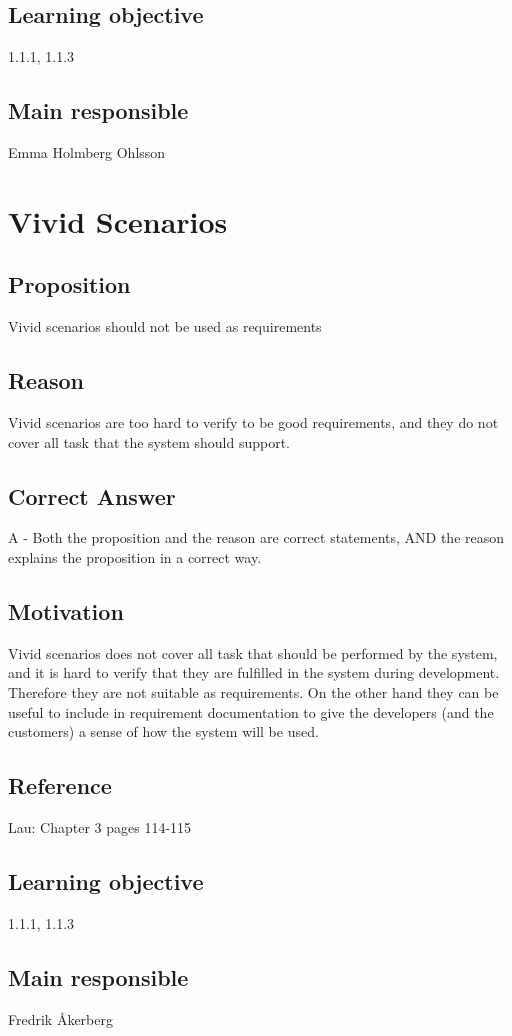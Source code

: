 \documentclass[a4paper]{article}
\begin{document}
\subsection*{Learning objective}
1.1.1, 1.1.3
\subsection*{Main responsible}
Emma Holmberg Ohlsson


\section{Vivid Scenarios}
\subsection*{Proposition}
Vivid scenarios should not be used as requirements
\subsection*{Reason}
Vivid scenarios are too hard to verify to be good requirements, and they do not cover all task that the system should support.
\subsection*{Correct Answer}
A - Both the proposition and the reason are correct statements, AND the reason explains the proposition in a correct way.
\subsection*{Motivation}
Vivid scenarios does not cover all task that should be performed by the system, and it is hard to verify that they are fulfilled in the system during development. Therefore they are not suitable as requirements. On the other hand they can be useful to include in requirement documentation to give the developers (and the customers) a sense of how the system will be used.
\subsection*{Reference}
Lau: Chapter 3 pages 114-115
\subsection*{Learning objective}
1.1.1, 1.1.3
\subsection*{Main responsible}
Fredrik Åkerberg
\end{document}
